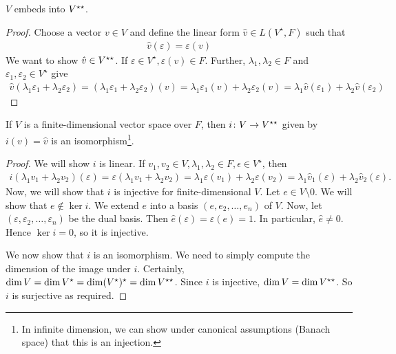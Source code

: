 \begin{theorem}
	$V$ embeds into $V^{\star\star}$.
\end{theorem}
\begin{proof}
	Choose a vector $v \in V$ and define the linear form $\hat v \in L(V^\star, F)$ such that
	\begin{align*}
		\hat v(\varepsilon) = \varepsilon(v)
	\end{align*}
	We want to show $\hat v \in V^{\star\star}$.
	If $\varepsilon \in V^\star, \varepsilon(v) \in F$.
	Further, $\lambda_1, \lambda_2 \in F$ and $\varepsilon_1, \varepsilon_2 \in V^\star$ give
	\begin{align*}
		\hat v (\lambda_1 \varepsilon_1 + \lambda_2 \varepsilon_2) = (\lambda_1 \varepsilon_1 + \lambda_2 \varepsilon_2)(v) = \lambda_1 \varepsilon_1(v) + \lambda_2 \varepsilon_2(v) = \lambda_1 \hat v(\varepsilon_1) + \lambda_2 \hat v(\varepsilon_2)
	\end{align*}
\end{proof}
\begin{theorem}
	If $V$ is a finite-dimensional vector space over $F$, then $i \colon V \to V^{\star\star}$ given by $i(v) = \hat v$ is an isomorphism\footnote{In infinite dimension, we can show under canonical assumptions (Banach space) that this is an injection.}.
\end{theorem}
\begin{proof}
	We will show $i$ is linear.
	If $v_1, v_2 \in V, \lambda_1, \lambda_2 \in F, \epsilon \in V^\star$, then
	\begin{align*}
		i(\lambda_1 v_1 + \lambda_2 v_2) (\varepsilon) = \varepsilon(\lambda_1 v_1 + \lambda_2 v_2) = \lambda_1 \varepsilon(v_1) + \lambda_2 \varepsilon(v_2) = \lambda_1 \hat v_1(\varepsilon) + \lambda_2 \hat v_2(\varepsilon).
	\end{align*}
	Now, we will show that $i$ is injective for finite-dimensional $V$.
	Let $e \in V \setminus \qty{0}$.
	We will show that $e \not\in \ker i$.
	We extend $e$ into a basis $(e, e_2, \dots, e_n)$ of $V$.
	Now, let $(\varepsilon, \varepsilon_2, \dots, \varepsilon_n)$ be the dual basis.
	Then $\hat e(\varepsilon) = \varepsilon(e) = 1$.
	In particular, $\hat e \neq 0$.
	Hence $\ker i = \qty{0}$, so it is injective.

	We now show that $i$ is an isomorphism.
	We need to simply compute the dimension of the image under $i$.
	Certainly, $\dim V = \dim V^\star = \dim (V^\star)^\star = \dim V^{\star\star}$.
	Since $i$ is injective, $\dim V = \dim V^{\star\star}$.
	So $i$ is surjective as required.
\end{proof}
